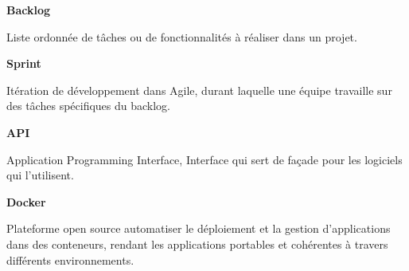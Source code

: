 \vspace{1cm}

\begin{minipage}{\textwidth}
    \begin{minipage}{0.1\textwidth}
        \textbf{Backlog}
    \end{minipage}\hfill
    \begin{minipage}{0.8\textwidth}
        Liste ordonnée de tâches ou de fonctionnalités à réaliser dans un projet.
    \end{minipage}
\end{minipage}

\vspace{1cm}

\begin{minipage}{\textwidth}
    \begin{minipage}{0.1\textwidth}
        \textbf{Sprint}
    \end{minipage}\hfill
    \begin{minipage}{0.8\textwidth}
        Itération de développement dans Agile, durant laquelle une équipe travaille sur des tâches spécifiques du backlog.
    \end{minipage}
\end{minipage}

\vspace{1cm}

\begin{minipage}{\textwidth}
    \begin{minipage}{0.1\textwidth}
        \textbf{API}
    \end{minipage}\hfill
    \begin{minipage}{0.8\textwidth}
        Application Programming Interface, Interface qui sert de façade pour les logiciels qui l'utilisent.
    \end{minipage}
\end{minipage}

\vspace{1cm}

\begin{minipage}{\textwidth}
    \begin{minipage}{0.1\textwidth}
        \textbf{Docker}
    \end{minipage}\hfill
    \begin{minipage}{0.8\textwidth}
        Plateforme open source automatiser le déploiement et la gestion d’applications dans des conteneurs, rendant les applications portables et cohérentes à travers différents environnements.
    \end{minipage}
\end{minipage}

